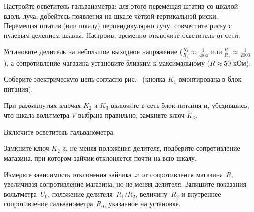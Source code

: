 \begin{lab:task}



	\item Настройте осветитель гальванометра: для этого перемещая штатив со
шкалой вдоль луча, добейтесь появления на шкале чёткой вертикальной
риски. Перемещая штатив (или шкалу) перпендикулярно лучу, совместите
риску с нулевым делением шкалы. Настроив, временно отключите осветитель
от сети.

	\item Установите делитель на небольшое выходное напряжение 
    ($\frac{R_1}{R_2} \approx \frac{1}{5000}$ 
    или $\frac{R_1}{R_2} \approx \frac{1}{2000}$), 
    а сопротивление магазина установите близким к максимальному ($R \approx 50$ кОм).

	\item Соберите электрическую цепь согласно рис.~
    (кнопка $K_1$ вмонтирована в блок питания).

	\item При разомкнутых ключах $K_2$ и
$K_3$ включите в сеть блок питания и, убедившись,
что шкала вольтметра $V$ выбрана правильно, замкните ключ
$K_3$.

	\item Включите осветитель гальванометра.

	\item Замкните ключ $K_2$ и, не меняя положения
делителя, подберите сопротивление магазина, при котором зайчик
отклоняется почти на всю шкалу.


	\item \label{p7-326} Измерьте зависимость отклонения зайчика~$x$ 
    от сопротивления магазина~$R$, увеличивая сопротивление магазина, 
    но не меняя делителя. Запишите показания вольтметра~$U_0$,
    положение делителя~$R_1/R_2$, величину~$R_2$ и внутреннее сопротивление
    гальванометра~$R_0$, указанное на установке.


\end{lab:task}
